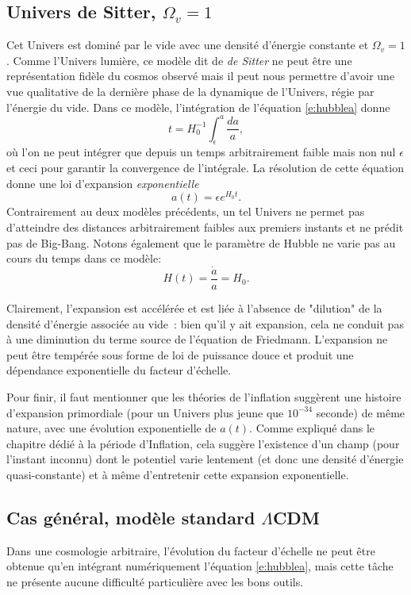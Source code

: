\subsection{Univers de Sitter, $\Omega_v=1$}
Cet Univers est dominé par le vide avec une densité d'énergie constante et $\Omega_v=1$. Comme l'Univers lumière, ce modèle dit de \textit{de Sitter} ne peut être une représentation fidèle du cosmos observé mais il peut nous permettre d'avoir une vue qualitative de la dernière phase de la dynamique de l'Univers, régie par l'énergie du vide. Dans ce modèle, l'intégration de l'équation \ref{e:hubblea} donne 
\begin{equation}
t=H_0^{-1}\int_\epsilon^a\frac{da}{a},
\end{equation}
où l'on ne peut intégrer que depuis un temps arbitrairement faible mais non nul $\epsilon$ et ceci pour garantir la convergence de l'intégrale. La résolution de cette équation donne une loi d'expansion \textit{exponentielle}
\begin{equation}
a(t)=\epsilon e^{H_0 t}.
\end{equation}
Contrairement au deux modèles précédents, un tel Univers ne permet pas d'atteindre des distances arbitrairement faibles aux premiers instants et ne prédit pas de Big-Bang. Notons également que le paramètre de Hubble ne varie pas au cours du temps dans ce modèle:
\begin{equation}
H(t)=\frac{\dot a}{a}=H_0.
\end{equation}

Clairement, l'expansion est accélérée et est liée à l'absence de "dilution" de la densité d'énergie associée au vide~: bien qu'il y ait expansion, cela ne conduit pas à une diminution du terme source de l'équation de Friedmann. L'expansion ne peut être tempérée sous forme de loi de puissance douce et produit une dépendance exponentielle du facteur d'échelle. 

Pour finir, il faut mentionner que les théories de l'inflation suggèrent une histoire d'expansion primordiale (pour un Univers plus jeune que $10^{-34}$ seconde) de même nature, avec une évolution exponentielle de $a(t)$.  Comme expliqué dans le chapitre dédié à la période d'Inflation, cela suggère l'existence d'un champ (pour l'instant inconnu) dont le potentiel varie lentement (et donc une densité d'énergie quasi-constante) et à même d'entretenir cette expansion exponentielle.

\subsection{Cas général, modèle standard $\Lambda$CDM}
Dans une cosmologie arbitraire, l'évolution du facteur d'échelle ne peut être obtenue qu'en intégrant numériquement l'équation \ref{e:hubblea}, mais cette tâche ne présente aucune difficulté particulière avec les bons outils. 

